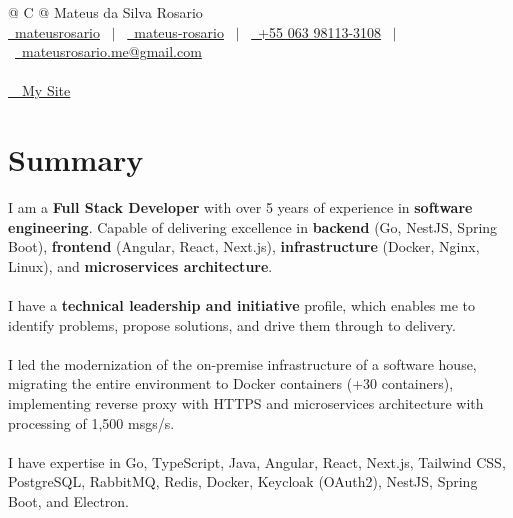 \documentclass[a4paper,12pt]{article}
\begin{document}
\pagestyle{empty} 



\begin{tabularx}{\linewidth}{@{} C @{}}
\Huge{Mateus da Silva Rosario} \\[7.5pt]
\href{https://github.com/mateusrosario}{\raisebox{-0.05\height}\faGithub\ mateusrosario} \ $|$ \ 
\href{https://linkedin.com/in/mateus-rosario}{\raisebox{-0.05\height}\faLinkedin\ mateus-rosario} \ $|$ \ 
\href{tel:+55063981133108}{\raisebox{-0.05\height}\faMobile \ +55 063 98113-3108} \ $|$ \
\href{mailto:mateusrosario.me@gmail.com}{\raisebox{-0.05\height}\faEnvelope \ mateusrosario.me@gmail.com} \\
\\
\href{https://dev.mrosario.com.br/}{\raisebox{-0.05\height} \ \faGlobe \ My Site}
\end{tabularx}

\section{Summary}
I am a \textbf{Full Stack Developer} with over 5 years
of experience in \textbf{software engineering}. Capable of
delivering excellence in \textbf{backend} (Go, NestJS, Spring
Boot), \textbf{frontend} (Angular, React, Next.js),
\textbf{infrastructure} (Docker, Nginx, Linux), and
\textbf{microservices architecture}.\\\\
I have a \textbf{technical leadership and initiative} profile,
which enables me to identify problems, propose solutions, and
drive them through to delivery.\\\\
I led the modernization of the
on-premise infrastructure of a software house, migrating the
entire environment to Docker containers (+30 containers),
implementing reverse proxy with HTTPS and microservices
architecture with processing of 1,500 msgs/s.\\\\
I have expertise in Go, TypeScript, Java, Angular, React,
Next.js, Tailwind CSS, PostgreSQL, RabbitMQ, Redis, Docker,
Keycloak (OAuth2), NestJS, Spring Boot, and Electron.
\end{document}
